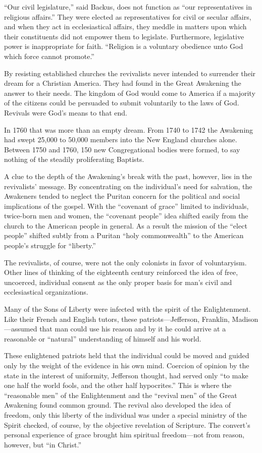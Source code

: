 “Our civil legislature,” said Backus, does not function as “our representatives in religious
affairs.” They were elected as representatives for civil or secular affairs, and when they act in
ecclesiastical affairs, they meddle in matters upon which their constituents did not empower them to
legislate. Furthermore, legislative power is inappropriate for faith. “Religion is a voluntary
obedience unto God which force cannot promote.”

By resisting established churches the revivalists never intended to surrender their dream for a
Christian America. They had found in the Great Awakening the answer to their needs. The kingdom of
God would come to America if a majority of the citizens could be persuaded to submit voluntarily to
the laws of God. Revivals were God’s means to that end.

In 1760 that was more than an empty dream. From 1740 to 1742 the Awakening had swept 25,000 to
50,000 members into the New England churches alone. Between 1750 and 1760, 150 new Congregational
bodies were formed, to say nothing of the steadily proliferating Baptists.

A clue to the depth of the Awakening’s break with the past, however, lies in the revivalists’
message. By concentrating on the individual’s need for salvation, the Awakeners tended to neglect
the Puritan concern for the political and social implications of the gospel. With the “covenant of
grace” limited to individuals, twice-born men and women, the “covenant people” idea shifted easily
from the church to the American people in general. As a result the mission of the “elect people”
shifted subtly from a Puritan “holy commonwealth” to the American people’s struggle for “liberty.”

The revivalists, of course, were not the only colonists in favor of voluntaryism. Other lines of
thinking of the eighteenth century reinforced the idea of free, uncoerced, individual consent as the
only proper basis for man’s civil and ecclesiastical organizations.

Many of the Sons of Liberty were infected with the spirit of the Enlightenment. Like their French
and English tutors, these patriots—Jefferson, Franklin, Madison—assumed that man could use his
reason and by it he could arrive at a reasonable or “natural” understanding of himself and his
world.

These enlightened patriots held that the individual could be moved and guided only by the weight of
the evidence in his own mind. Coercion of opinion by the state in the interest of uniformity,
Jefferson thought, had served only “to make one half the world fools, and the other half
hypocrites.” This is where the “reasonable men” of the Enlightenment and the “revival men” of the
Great Awakening found common ground. The revival also developed the idea of freedom, only this
liberty of the individual was under a special ministry of the Spirit checked, of course, by the
objective revelation of Scripture. The convert’s personal experience of grace brought him spiritual
freedom—not from reason, however, but “in Christ.”

